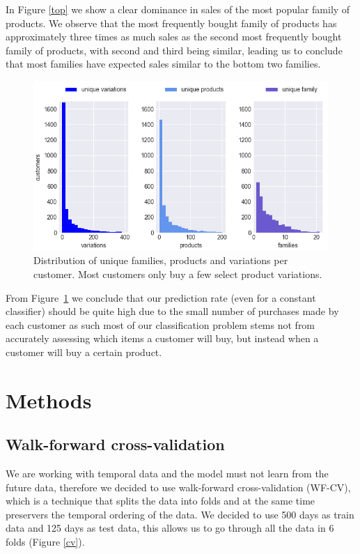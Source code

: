 \documentclass[fleqn,moreauthors,10pt]{ds_report}
\begin{document}
In \noindent Figure \ref{top} we show a clear dominance in sales of the most popular family of products. We observe that the most frequently bought family of products has approximately three times as much sales as the second most frequently bought family of products, with second and third being similar, leading us to conclude that most families have expected sales similar to the bottom two families.

\begin{figure}[H]\centering
	\includegraphics[width=\linewidth]{unique.png}
	\caption{Distribution of unique families, products and variations per customer. Most customers only buy a few select product variations.}
	\label{unique}
\end{figure}

\noindent From Figure~\ref{unique} we conclude that our prediction rate (even for a constant classifier) should be quite high due to the small number of purchases made by each customer as such most of our classification problem stems not from accurately assessing which items a customer will buy, but instead when a customer will buy a certain product.

\section*{Methods}

\subsection*{Walk-forward cross-validation}

\noindent We are working with temporal data and the model must not learn from the future data, therefore we decided to use walk-forward cross-validation (WF-CV), which is a technique that splits the data into folds and at the same time preservers the temporal ordering of the data. We decided to use 500 days as train data and 125 days as test data, this allows us to go through all the data in 6 folds (Figure \ref{cv}). 
\end{document}
